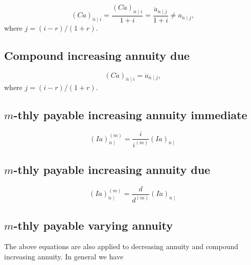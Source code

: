 \documentclass[
]{book}
\begin{document}
\[(Ca)_{\overline{n}\mid i}=\frac{(C\ddot{a})_{\overline{n}\mid i}}{1+i}=\frac{\ddot{a}_{\overline{n}\mid j}}{1+i}\neq{a}_{\overline{n}\mid j},\]
where \(j=(i-r)/(1+r).\)

\hypertarget{compound-increasing-annuity-due}{%
\subsection*{Compound increasing annuity due}\label{compound-increasing-annuity-due}}

\[(C\ddot{a})_{\overline{n}\mid i}=\ddot{a}_{\overline{n}\mid j},\]
where \(j=(i-r)/(1+r).\)

\hypertarget{m-thly-payable-increasing-annuity-immediate}{%
\subsection*{\texorpdfstring{\(m\)-thly payable increasing annuity immediate}{m-thly payable increasing annuity immediate}}\label{m-thly-payable-increasing-annuity-immediate}}

\[(Ia)^{(m)}_{\overline{n}\mid}=\frac{i}{i^{(m)}}(Ia)_{\overline{n}\mid}\]

\hypertarget{m-thly-payable-increasing-annuity-due}{%
\subsection*{\texorpdfstring{\(m\)-thly payable increasing annuity due}{m-thly payable increasing annuity due}}\label{m-thly-payable-increasing-annuity-due}}

\[(I\ddot{a})^{(m)}_{\overline{n}\mid}=\frac{d}{d^{(m)}}(I\ddot{a})_{\overline{n}\mid}\]

\hypertarget{m-thly-payable-varying-annuity}{%
\subsection*{\texorpdfstring{\(m\)-thly payable varying annuity}{m-thly payable varying annuity}}\label{m-thly-payable-varying-annuity}}

The above equations are also applied to decreasing annuity and compound increasing annuity. In general we have
\end{document}
